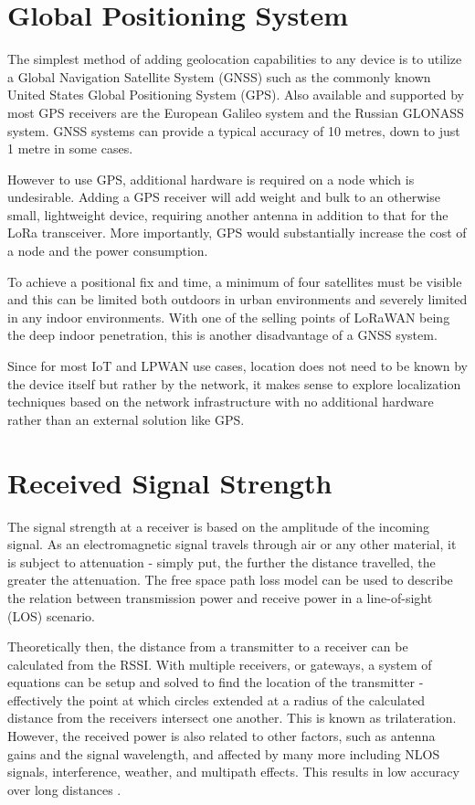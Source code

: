 \documentclass[a4paper]{report}
\begin{document}
  \section{Global Positioning System}
    The simplest method of adding geolocation capabilities to any device is to utilize a Global Navigation Satellite System (GNSS) such as the commonly known United States Global Positioning System (GPS). Also available and supported by most GPS receivers are the European Galileo system and the Russian GLONASS system. GNSS systems can provide a typical accuracy of 10 metres, down to just 1 metre in some cases.

    However to use GPS, additional hardware is required on a node which is undesirable. Adding a GPS receiver will add weight and bulk to an otherwise small, lightweight device, requiring another antenna in addition to that for the LoRa transceiver. More importantly, GPS would substantially increase the cost of a node and the power consumption.

    To achieve a positional fix and time, a minimum of four satellites must be visible and this can be limited both outdoors in urban environments and severely limited in any indoor environments. With one of the selling points of LoRaWAN being the deep indoor penetration, this is another disadvantage of a GNSS system.

    Since for most IoT and LPWAN use cases, location does not need to be known by the device itself but rather by the network, it makes sense to explore localization techniques based on the network infrastructure with no additional hardware rather than an external solution like GPS.

  \section{Received Signal Strength}
    The signal strength at a receiver is based on the amplitude of the incoming signal. As an electromagnetic signal travels through air or any other material, it is subject to attenuation - simply put, the further the distance travelled, the greater the attenuation. The free space path loss model can be used to describe the relation between transmission power and receive power in a line-of-sight (LOS) scenario.

    Theoretically then, the distance from a transmitter to a receiver can be calculated from the RSSI. With multiple receivers, or gateways, a system of equations can be setup and solved to find the location of the transmitter - effectively the point at which circles extended at a radius of the calculated distance from the receivers intersect one another. This is known as trilateration. However, the received power is also related to other factors, such as antenna gains and the signal wavelength, and affected by many more including NLOS signals, interference, weather, and multipath effects. This results in low accuracy over long distances \cite{Yang:2009}.
\end{document}
